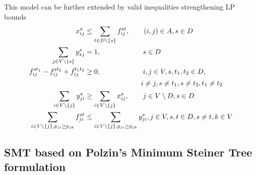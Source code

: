 This model can be further extended by valid inequalities strengthening LP bounds
  \begin{subequations}
  \begin{flalign}
\label{con:vi:xImpY}  x^{s}_{ij} & \leq \sum\limits_{t\in D\setminus\{s\}}  f^{st}_{ij},  \quad\quad    (i,j)\in A,s\in D \\
 \label{con:vi:Y1}  \sum\limits_{j\in V\setminus\{s\}}  y^{s}_{sj} & =1,  \quad\quad\quad\quad\quad\quad    s\in D \\
\label{con:vi:f2dest}  f^{st_1}_{ij}-f^{st_2}_{ij}+f^{t_1t_2}_{ij} & \geq 0, \quad\quad\quad\quad\quad\quad i,j \in V,s,t_1,t_2\in D, \\
   &     \notag\quad\quad\quad\quad\quad\quad\quad\quad i\neq j, s\neq t_1,s\neq t_2, t_1\neq t_2  \\
\label{con:vi:sumYImpSumX} \sum\limits_{i\in V\setminus\{j\} }y^{s}_{ji} & \geq \sum\limits_{i\in V\setminus\{j\}}  x^{s}_{ij},   \quad\quad   j\in V\setminus D, s\in D \\
\label{con:vi:sumFImpSumY} \sum\limits_{i\in V\setminus\{j\}, p_{ji}\geq p_{jk}  }f^{st}_{ji} & \leq \sum\limits_{i\in V\setminus\{j\}, p_{ji}\geq p_{jk}}  y^{s}_{ji},   j\in V, s, t\in D, s \neq t, k\in V                     
                      \end{flalign}
  \end{subequations}
\subsection{SMT based on Polzin's Minimum Steiner Tree formulation}

